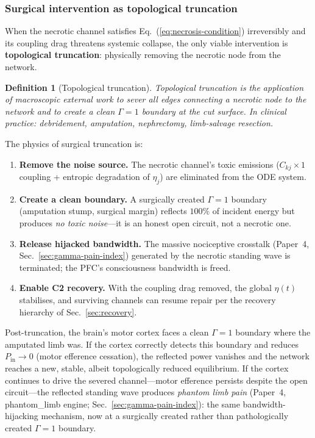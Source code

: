 \documentclass[aps,pre,twocolumn,superscriptaddress,floatfix]{revtex4-2}
\newtheorem{definition}{Definition}
\begin{document}
\subsubsection{Surgical intervention as topological
  truncation}

When the necrotic channel satisfies
Eq.~(\ref{eq:necrosis-condition}) irreversibly and its
coupling drag threatens systemic collapse, the only
viable intervention is \textbf{topological truncation}:
physically removing the necrotic node from the network.

\begin{definition}[Topological truncation]
\label{def:truncation}
Topological truncation is the application of
\emph{macroscopic external work} to sever all edges
connecting a necrotic node to the network and
to create a clean $\Gamma = 1$ boundary at the
cut surface.
In clinical practice: debridement, amputation,
nephrectomy, limb-salvage resection.
\end{definition}

\noindent
The physics of surgical truncation is:
\begin{enumerate}
  \item \textbf{Remove the noise source.}
    The necrotic channel's toxic emissions
    ($C_{kj} \times 1$ coupling +
    entropic degradation of $\eta_j$) are
    eliminated from the ODE system.
  \item \textbf{Create a clean boundary.}
    A surgically created $\Gamma = 1$ boundary
    (amputation stump, surgical margin) reflects
    $100\%$ of incident energy but produces
    \emph{no toxic noise}---it is an
    honest open circuit, not a necrotic one.
  \item \textbf{Release hijacked bandwidth.}
    The massive nociceptive crosstalk
    (Paper~4, Sec.~\ref{sec:gamma-pain-index})
    generated by the necrotic standing wave is
    terminated; the PFC's consciousness bandwidth
    is freed.
  \item \textbf{Enable C2 recovery.}
    With the coupling drag removed, the global
    $\eta(t)$ stabilises, and surviving channels
    can resume repair per the recovery hierarchy
    of Sec.~\ref{sec:recovery}.
\end{enumerate}

Post-truncation, the brain's motor cortex faces a
clean $\Gamma = 1$ boundary where the amputated limb
was.
If the cortex correctly detects this boundary and
reduces $P_{\text{in}} \to 0$ (motor efference
cessation), the reflected power vanishes and the
network reaches a new, stable, albeit topologically
reduced equilibrium.
If the cortex continues to drive the severed
channel---motor efference persists despite the
open circuit---the reflected standing wave produces
\emph{phantom limb pain}
(Paper~4, phantom\_limb engine;
Sec.~\ref{sec:gamma-pain-index}):
the same bandwidth-hijacking mechanism, now at a
surgically created rather than pathologically created
$\Gamma = 1$ boundary.
\end{document}
